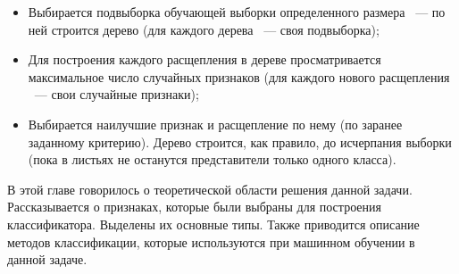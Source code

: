 \begin{itemize}
	\item Выбирается подвыборка обучающей выборки определенного размера  ~--- по ней строится дерево (для каждого дерева ~--- своя подвыборка);
	\item Для построения каждого расщепления в дереве просматривается максимальное число случайных признаков (для каждого нового расщепления ~--- свои случайные признаки);
	\item Выбирается наилучшие признак и расщепление по нему (по заранее заданному критерию). Дерево строится, как правило, до исчерпания выборки (пока в листьях не останутся представители только одного класса).
\end{itemize}

\chapterconclusion

В этой главе говорилось о теоретической области решения данной задачи.
Рассказывается о признаках, которые были выбраны для построения классификатора.
Выделены их основные типы.
Также приводится описание методов классификации, которые используются при машинном обучении в данной задаче.